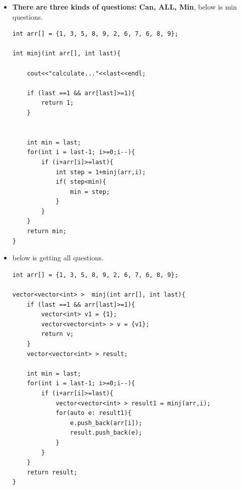 \documentclass[a4paper,12pt,twoside]{book}
\begin{document}
\begin{itemize}
\begin{lstlisting}[numbers=none]
vector<vector<string> > ac(string target, const vector<string> & in ){
	if (target.size() == 0){
		return vector<vector<string>> {{}};
	}
	
	vector<vector<string>> last_result;
	
	for(auto i: input){
		if (target.find(i) == 0){
			string sub = target;
			sub.erase(0, i.size());
			vector<vector<string>> re = ac(sub, in);
			for(auto j : re){
				j.push_back(i);
				last_result.push_back(j);
			}
		}
	}
	return last_result;
}

int main() 
{ 
	string test("aabb");
	cout<<test.find("aa");
	test.erase(0,2);
	cout<<test.size()<<endl;
	vector<vector<string>> result = ac(target, input);
	
	for(auto i: result ){
		for(auto j: i){
			cout<< j<<" ";
		}
		cout<<endl;
	}
	
	cout<< "hello"<<endl;
	return 0; 
}

\end{lstlisting} 

\subsubsection{Top-down}

\item \textbf{There are three kinds of questions: Can, ALL, Min}, below is min questions.  

\begin{lstlisting}[numbers=none]
int arr[] = {1, 3, 5, 8, 9, 2, 6, 7, 6, 8, 9};

int minj(int arr[], int last){
	
	cout<<"calculate..."<<last<<endl;
	
	if (last ==1 && arr[last]>=1){
		return 1;
	}
	
	
	int min = last;
	for(int i = last-1; i>=0;i--){
		if (i+arr[i]>=last){
			int step = 1+minj(arr,i);
			if( step<min){
				min = step;
			}
		}    
	}
	return min;
}
\end{lstlisting} 

\item below is getting all questions.  
\begin{lstlisting}[numbers=none]
int arr[] = {1, 3, 5, 8, 9, 2, 6, 7, 6, 8, 9};

vector<vector<int> >  minj(int arr[], int last){	
	if (last ==1 && arr[last]>=1){
		vector<int> v1 = {1};
		vector<vector<int> > v = {v1};
		return v;
	}	
	vector<vector<int> > result;
	
	int min = last;
	for(int i = last-1; i>=0;i--){
		if (i+arr[i]>=last){
			vector<vector<int> > result1 = minj(arr,i);
			for(auto e: result1){
				e.push_back(arr[i]);
				result.push_back(e);
			}
		}
	}
	return result;
}


\end{lstlisting}
\end{itemize}
\end{document}

